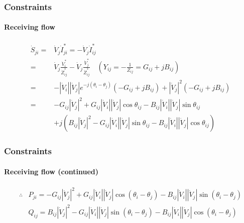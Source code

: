 \documentclass[
	11pt, %
	aspectratio=169, %
]{beamer}
\begin{document}

\begin{frame}
	\frametitle{Constraints}
	\framesubtitle{Receiving flow} %

	\begin{align*}
		\dot{S}_{ji}=&\dot{V}_{j}\dot{I}_{ji}^{*} = -\dot{V}_{j}\dot{I}_{ij}^{*}    \\
		=&\dot{V}_{j}\frac{\dot{V}_{i}^{*}}{\dot{Z}_{ij}^{*}} - \dot{V}_{j}\frac{\dot{V}_{j}^{*}}{\dot{Z}_{ij}^{*}} \quad \left(Y_{ij} =-\frac{1}{Z_{ij}} = G_{ij}+jB_{ij}\right) \\
		=&- \left\lvert \dot{V}_{i}\right\rvert\left\lvert \dot{V}_{j}\right\rvert e^{-j\left(\theta_{i}-\theta_{j}\right) } \left(-G_{ij}+jB_{ij}\right) + \left\lvert \dot{V}_{j}\right\rvert^{2} \left(-G_{ij}+jB_{ij}\right) \\
		=&-G_{ij}\left\lvert \dot{V}_{j}\right\rvert^{2} + G_{ij}\left\lvert \dot{V}_{i}\right\rvert\left\lvert \dot{V}_{j}\right\rvert \cos{\theta_{ij}} - B_{ij}\left\lvert \dot{V}_{i}\right\rvert\left\lvert \dot{V}_{j}\right\rvert \sin{\theta_{ij}}  \\
		 &+j\left( B_{ij}\left\lvert \dot{V}_{j}\right\rvert^{2} - G_{ij}\left\lvert \dot{V}_{i}\right\rvert\left\lvert \dot{V}_{j}\right\rvert \sin{\theta_{ij}} - B_{ij}\left\lvert \dot{V}_{i}\right\rvert\left\lvert \dot{V}_{j}\right\rvert \cos{\theta_{ij}} \right) 
	\end{align*}

	
\end{frame}


\begin{frame}
	\frametitle{Constraints}
	\framesubtitle{Receiving flow (continued)} %

	\begin{align*}
	 	\therefore &P_{ji}=-G_{ij}\left\lvert \dot{V}_{j}\right\rvert^{2} + G_{ij}\left\lvert \dot{V}_{i}\right\rvert\left\lvert \dot{V}_{j}\right\rvert \cos{\left(\theta_{i}-\theta_{j}\right)} - B_{ij}\left\lvert \dot{V}_{i}\right\rvert\left\lvert \dot{V}_{j}\right\rvert \sin{\left(\theta_{i}-\theta_{j}\right)}\\
		&Q_{ij}=B_{ij}\left\lvert \dot{V}_{j}\right\rvert^{2} - G_{ij}\left\lvert \dot{V}_{i}\right\rvert\left\lvert \dot{V}_{j}\right\rvert \sin{\left(\theta_{i}-\theta_{j}\right)} - B_{ij}\left\lvert \dot{V}_{i}\right\rvert\left\lvert \dot{V}_{j}\right\rvert \cos{\left(\theta_{i}-\theta_{j}\right)}
	\end{align*}

	
\end{frame}
\end{document}
